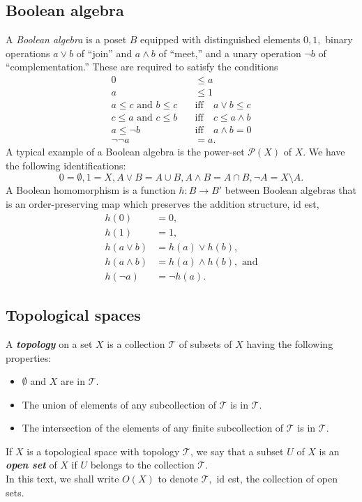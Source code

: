 \subsection{Boolean algebra} \label{boolalg}
A \emph{Boolean algebra} is a poset $B$ equipped with distinguished elements $0, 1,$ binary operations $a\vee b$ of ``join'' and $a\wedge b$ of ``meet,'' and a unary operation $\neg b$ of ``complementation.'' These are required to satisfy the conditions
\begin{align*} 
	0 &\le a\\
	a &\le 1\\
	a \le c \text{ and } b \le c \quad &\text{iff} \quad a \vee b \le c \\
	c \le a \text{ and } c \le b \quad &\text{iff} \quad c \le a \wedge b \\
	a \le \neg b \quad &\text{iff} \quad a \wedge b = 0\\
	\neg\neg a  &= a.
\end{align*}
A typical example of a Boolean algebra is the power-set $\mathcal{P}(X)$ of $X.$ We have the following identifications:
\begin{equation*} 
	0 = \emptyset, 1 = X, A \vee B = A \cup B, A \wedge B = A \cap B, \neg A = X\setminus A.
\end{equation*}
A Boolean homomorphism is a function $h:B\to B'$ between Boolean algebras that is an order-preserving map which preserves the addition structure, id est, 
\begin{align*} 
	h(0) &= 0, \\
	h(1) &= 1, \\
	h(a \vee b) &= h(a) \vee h(b), \\
	h(a \wedge b) &= h(a) \wedge h(b), \text{ and} \\
	h(\neg a) &= \neg h(a).
\end{align*}
%
\subsection{Topological spaces}
A \textbf{\emph{topology}} on a set $X$ is a collection $\mathcal{T}$ of subsets of $X$ having the following properties:
\begin{itemize} 
\item $\emptyset$ and $X$ are in $\mathcal{T}.$
\item The union of elements of any subcollection of $\mathcal{T}$ is in $\mathcal{T}.$
\item The intersection of the elements of any finite subcollection of $\mathcal{T}$ is in $\mathcal{T}.$
\end{itemize}
If $X$ is a topological space with topology $\mathcal{T}$, we say that a subset $U$ of $X$ is an \textbf{\emph{open set}} of $X$ if $U$ belongs to the collection $\mathcal{T}.$\\
In this text, we shall write $O(X)$ to denote $\mathcal{T},$ id est, the collection of open sets.
%
